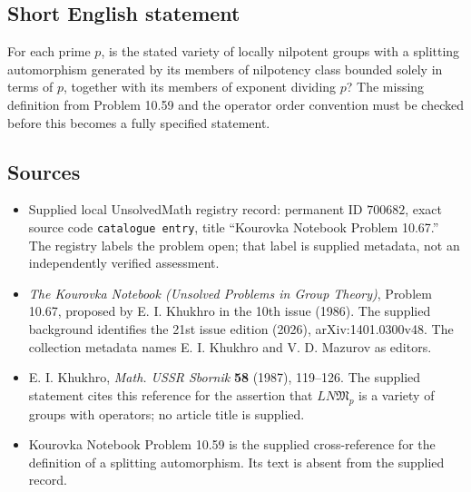 \documentclass[11pt]{article}
\begin{document}
\subsection{Short English statement}
For each prime \(p\), is the stated variety of locally nilpotent groups with a splitting automorphism generated by its members of nilpotency class bounded solely in terms of \(p\), together with its members of exponent dividing \(p\)? The missing definition from Problem 10.59 and the operator order convention must be checked before this becomes a fully specified statement.
\subsection{Sources}
\begin{itemize}
\item Supplied local UnsolvedMath registry record: permanent ID \(700682\), exact source code \texttt{catalogue entry}, title ``Kourovka Notebook Problem 10.67.'' The registry labels the problem open; that label is supplied metadata, not an independently verified assessment.
\item \emph{The Kourovka Notebook (Unsolved Problems in Group Theory)}, Problem 10.67, proposed by E. I. Khukhro in the 10th issue (1986). The supplied background identifies the 21st issue edition (2026), arXiv:1401.0300v48. The collection metadata names E. I. Khukhro and V. D. Mazurov as editors.
\item E. I. Khukhro, \emph{Math. USSR Sbornik} \textbf{58} (1987), 119--126. The supplied statement cites this reference for the assertion that \(LN\mathfrak M_p\) is a variety of groups with operators; no article title is supplied.
\item Kourovka Notebook Problem 10.59 is the supplied cross-reference for the definition of a splitting automorphism. Its text is absent from the supplied record.
\end{itemize}
\end{document}
